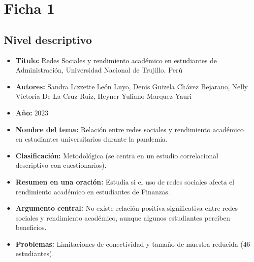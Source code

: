 \documentclass[12pt]{article}
\begin{document}
\section*{Ficha 1}

\subsection*{Nivel descriptivo}
\begin{itemize}
  \item \textbf{Título:} Redes Sociales y rendimiento académico en estudiantes de Administración, Universidad Nacional de Trujillo. Perú
  \item \textbf{Autores:} Sandra Lizzette León Luyo, Denis Guizela Chávez Bejarano, Nelly Victoria De La Cruz Ruiz, Heyner Yuliano Marquez Yauri
  \item \textbf{Año:} 2023
  \item \textbf{Nombre del tema:} Relación entre redes sociales y rendimiento académico en estudiantes universitarios durante la pandemia.
  \item \textbf{Clasificación:} Metodológica (se centra en un estudio correlacional descriptivo con cuestionarios).
  \item \textbf{Resumen en una oración:} Estudia si el uso de redes sociales afecta el rendimiento académico en estudiantes de Finanzas.
  \item \textbf{Argumento central:} No existe relación positiva significativa entre redes sociales y rendimiento académico, aunque algunos estudiantes perciben beneficios.
  \item \textbf{Problemas:} Limitaciones de conectividad y tamaño de muestra reducida (46 estudiantes).
\end{itemize}
\end{document}
